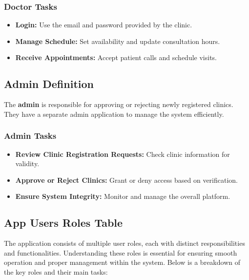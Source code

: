 \documentclass[12pt]{report}
\begin{document}
\subsubsection{\textbf{Doctor Tasks}}
\begin{itemize}
	\item \textbf{Login:} Use the email and password provided by the clinic.
	\item \textbf{Manage Schedule:} Set availability and update consultation hours.
	\item \textbf{Receive Appointments:} Accept patient calls and schedule visits.
\end{itemize}

\vspace{0.5cm}


\subsection{\textbf{Admin Definition}}

\noindent The \textbf{admin} is responsible for approving or rejecting newly registered clinics. They have a separate admin application to manage the system efficiently.

\subsubsection{\textbf{Admin Tasks}}
\begin{itemize}
	\item \textbf{Review Clinic Registration Requests:} Check clinic information for validity.
	\item \textbf{Approve or Reject Clinics:} Grant or deny access based on verification.
	\item \textbf{Ensure System Integrity:} Monitor and manage the overall platform.
\end{itemize}


















\subsection{App Users Roles Table}
\noindent The application consists of multiple user roles, each with distinct responsibilities and functionalities. Understanding these roles is essential for ensuring smooth operation and proper management within the system. Below is a breakdown of the key roles and their main tasks:
\end{document}
